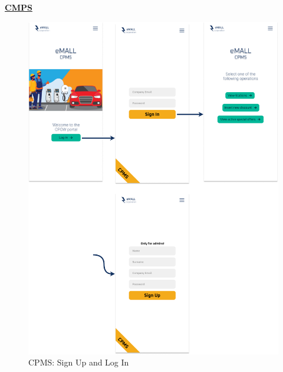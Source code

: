 \documentclass[table, 12pt]{article}
\begin{document}
\underline{\textbf{CMPS}}\\
\begin{center}
    \begin{figure}[H]
        \includegraphics[scale=0.35, center]{assets/UI charts/CPMS welcome.png}
        \caption{CPMS: Sign Up and Log In}
        \label{fig: CPMSsignMockup}
    \end{figure}
    \newpage
\end{center}
\end{document}
